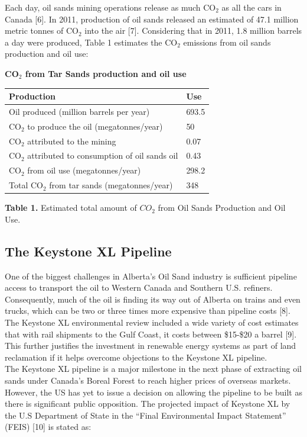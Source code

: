 \documentclass[11pt]{article}
\begin{document}
Each day, oil sands mining operations release as much CO$_2$ as all the cars in Canada [6]. In 2011, production of oil sands released an estimated of 47.1 million metric tonnes of CO$_2$ into the air [7]. Considering that in 2011, 1.8 million barrels a day were produced, Table 1 estimates the CO$_2$ emissions from oil sands production and oil use: \\

\newpage

\begin{center}
{\bf CO$_2$ from Tar Sands production and oil use} \\
\begin{tabular}{|l|l|}
\hline
\cellcolor[gray]{0.8} {\bf Production} & \cellcolor[gray]{0.8} {\bf Use} \\
\hline
Oil produced (million barrels per year) & 693.5\\
\hline
CO$_2$ to produce the oil (megatonnes/year) & 50 \\
\hline
\hspace{8.5em} CO$_2$ attributed to the mining & 0.07 \\
\hline
\hspace{1em} CO$_2$ attributed to consumption of oil sands oil & 0.43\\
\hline
CO$_2$ from oil use (megatonnes/year)  & 298.2 \\
\hline  
Total CO$_2$ from tar sands (megatonnes/year) & 348 \\
\hline
\end{tabular}
\end{center}
\begin{center}
{\bf Table 1.} Estimated total amount of $CO_2$ from Oil Sands Production and Oil Use.
\end{center}

\subsection{The Keystone XL Pipeline}
One of the biggest challenges in Alberta's Oil Sand industry is sufficient pipeline access to transport the oil to Western Canada and Southern U.S. refiners. Consequently, much of the oil is finding its way out of Alberta on trains and even trucks, which can be two or three times more expensive than pipeline costs [8]. The Keystone XL environmental review included a wide variety of cost estimates that with rail shipments to the Gulf Coast, it costs between \$15-\$20 a barrel [9]. This further justifies the investment in renewable energy systems as part of land reclamation if it helps overcome objections to the Keystone XL pipeline.\\
The Keystone XL pipeline is a major milestone in the next phase of extracting oil sands under Canada's Boreal Forest to reach higher prices of overseas markets. However, the US has yet to issue a decision on allowing the pipeline to be built as there is significant public opposition.  The projected impact of Keystone XL by the U.S Department of State in the “Final Environmental Impact Statement” (FEIS) [10] is stated as:
\end{document}
